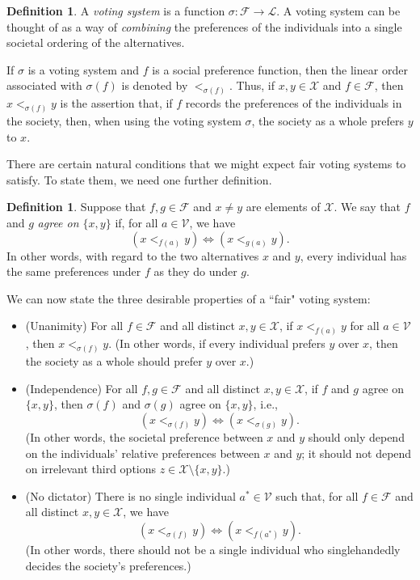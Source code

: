 \documentclass[a4paper]{memoir}
\theoremstyle{definition}
\newtheorem{definition}[theorem]{Definition}
\newcommand{\mc}{\mathcal}
\newcommand{\ra}{\rightarrow}
\begin{document}
\begin{definition}
  A \emph{voting system} is a function $\sigma : \mc{F} \ra \mc{L}$. A voting system can be 
  thought of as a way of \emph{combining} the preferences of the individuals into a single 
  societal ordering of the alternatives. 
\end{definition}

If $\sigma$ is a voting system and $f$ is a social preference function, then the linear order 
associated with $\sigma(f)$ is denoted by $<_{\sigma(f)}$. Thus, if $x,y \in \mc{X}$ and 
$f \in \mc{F}$, then $x <_{\sigma(f)} y$ is the assertion that, if $f$ records the preferences 
of the individuals in the society, then, when using the voting system $\sigma$, the society 
as a whole prefers $y$ to $x$.

There are certain natural conditions that we might expect fair voting systems to satisfy. 
To state them, we need one further definition.

\begin{definition}
  Suppose that $f,g \in \mc{F}$ and $x \neq y$ are elements of $\mc{X}$. We say that $f$ 
  and $g$ \emph{agree on $\{x,y\}$} if, for all $a \in \mc{V}$, we have
  \[
    (x <_{f(a)} y) \Longleftrightarrow (x <_{g(a)} y).
  \]
  In other words, with regard to the two alternatives $x$ and $y$, every individual has the 
  same preferences under $f$ as they do under $g$.
\end{definition}

We can now state the three desirable properties of a ``fair" voting system:

\begin{itemize}
  \item (Unanimity) For all $f \in \mc{F}$ and all distinct $x,y \in \mc{X}$, if 
  $x <_{f(a)} y$ for all $a \in \mc{V}$, then $x <_{\sigma(f)} y$.
  (In other words, if every individual prefers $y$ over $x$, then the society as a whole should 
  prefer $y$ over $x$.)
  \item (Independence) For all $f,g \in \mc{F}$ and all distinct $x,y \in \mc{X}$, 
  if $f$ and $g$ agree on $\{x,y\}$, then $\sigma(f)$ and $\sigma(g)$ agree on $\{x,y\}$, i.e., 
  \[
    (x <_{\sigma(f)} y) \Longleftrightarrow (x <_{\sigma(g)} y).
  \]
  (In other words, the societal preference between $x$ and $y$ should only depend on the 
  individuals' relative preferences between $x$ and $y$; it should not depend on irrelevant 
  third options $z \in \mc{X} \setminus \{x,y\}$.)
  \item (No dictator) There is no single individual $a^* \in \mc{V}$ such that, for all 
  $f \in \mc{F}$ and all distinct $x,y \in \mc{X}$, we have
  \[
    (x <_{\sigma(f)} y) \Longleftrightarrow (x <_{f(a^*)} y).
  \]
  (In other words, there should not be a single individual who singlehandedly decides the 
  society's preferences.)
\end{itemize}
\end{document}
